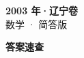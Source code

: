 \documentclass[zihao=-4, a4paper]{ctexart}
\begin{document}
\begin{center}
  {\Large\bfseries 2003 年·辽宁卷}\\[4pt]
  {\large 数学 · 简答版}
\end{center}
\medskip
{}

\clearpage
{}
\begin{center}{\Large\bfseries 答案速查}\end{center}
\medskip

\end{document}

